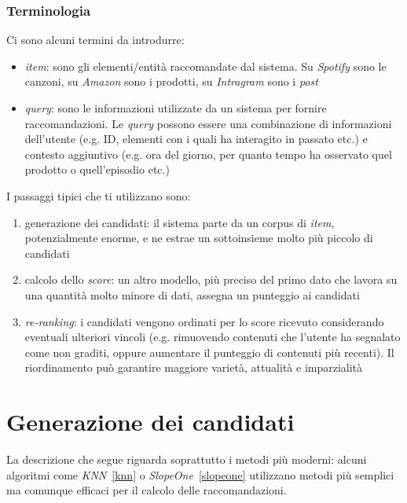 \subsubsection{Terminologia}
Ci sono alcuni termini da introdurre:

\begin{itemize}
    \item \textit{item}: sono gli elementi/entità raccomandate dal sistema. Su \textit{Spotify} sono le canzoni, su \textit{Amazon} sono i prodotti, su \textit{Intragram} sono i \textit{post}
    \item \textit{query}: sono le informazioni utilizzate da un sistema per fornire raccomandazioni. Le \textit{query} possono essere una combinazione di informazioni dell'utente (e.g. ID, elementi con i quali ha interagito in passato etc.) e contesto aggiuntivo (e.g. ora del giorno, per quanto tempo ha osservato quel prodotto o quell'episodio etc.)
\end{itemize}

I passaggi tipici che ti utilizzano sono: 

\begin{enumerate}
    \item generazione dei candidati: il sistema parte da un corpus di \textit{item}, potenzialmente enorme, e ne estrae un sottoinsieme molto più piccolo di candidati
    \item calcolo dello \textit{score}: un altro modello, più preciso del primo dato che lavora su una quantità molto minore di dati, assegna un punteggio ai candidati
    \item \textit{re-ranking}: i candidati vengono ordinati per lo score ricevuto considerando eventuali ulteriori vincoli (e.g. rimuovendo contenuti che l'utente ha segnalato come non graditi, oppure aumentare il punteggio di contenuti più recenti). Il riordinamento può garantire maggiore varietà, attualità e imparzialità
\end{enumerate}

\section{Generazione dei candidati}\label{generazione_dei_candidati}

La descrizione che segue riguarda soprattutto i metodi più moderni: alcuni algoritmi come \textit{KNN}~\ref{knn} o \textit{SlopeOne}~\ref{slopeone} utilizzano metodi più semplici ma comunque efficaci per il calcolo delle raccomandazioni.

